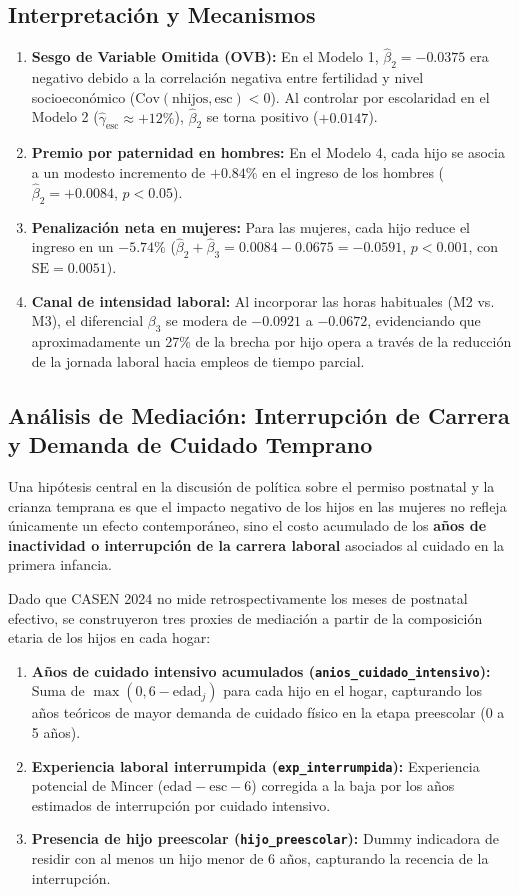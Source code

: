 \documentclass[11pt,a4paper]{article}
\begin{document}
\subsection{Interpretación y Mecanismos}
\begin{enumerate}
    \item \textbf{Sesgo de Variable Omitida (OVB):} En el Modelo 1, $\hat{\beta}_2 = -0.0375$ era negativo debido a la correlación negativa entre fertilidad y nivel socioeconómico ($\text{Cov}(\text{nhijos}, \text{esc}) < 0$). Al controlar por escolaridad en el Modelo 2 ($\hat{\gamma}_{\text{esc}} \approx +12\%$), $\hat{\beta}_2$ se torna positivo ($+0.0147$).
    \item \textbf{Premio por paternidad en hombres:} En el Modelo 4, cada hijo se asocia a un modesto incremento de $+0.84\%$ en el ingreso de los hombres ($\hat{\beta}_2 = +0.0084$, $p < 0.05$).
    \item \textbf{Penalización neta en mujeres:} Para las mujeres, cada hijo reduce el ingreso en un \textbf{$-5.74\%$} ($\hat{\beta}_2 + \hat{\beta}_3 = 0.0084 - 0.0675 = -0.0591$, $p < 0.001$, con $\text{SE} = 0.0051$).
    \item \textbf{Canal de intensidad laboral:} Al incorporar las horas habituales (M2 vs. M3), el diferencial $\beta_3$ se modera de $-0.0921$ a $-0.0672$, evidenciando que aproximadamente un 27\% de la brecha por hijo opera a través de la reducción de la jornada laboral hacia empleos de tiempo parcial.
\end{enumerate}

\subsection{Análisis de Mediación: Interrupción de Carrera y Demanda de Cuidado Temprano}
Una hipótesis central en la discusión de política sobre el permiso postnatal y la crianza temprana es que el impacto negativo de los hijos en las mujeres no refleja únicamente un efecto contemporáneo, sino el costo acumulado de los \textbf{años de inactividad o interrupción de la carrera laboral} asociados al cuidado en la primera infancia.

Dado que CASEN 2024 no mide retrospectivamente los meses de postnatal efectivo, se construyeron tres proxies de mediación a partir de la composición etaria de los hijos en cada hogar:
\begin{enumerate}
    \item \textbf{Años de cuidado intensivo acumulados (\texttt{anios\_cuidado\_intensivo}):} Suma de $\max(0, 6 - \text{edad}_j)$ para cada hijo en el hogar, capturando los años teóricos de mayor demanda de cuidado físico en la etapa preescolar (0 a 5 años).
    \item \textbf{Experiencia laboral interrumpida (\texttt{exp\_interrumpida}):} Experiencia potencial de Mincer ($\text{edad} - \text{esc} - 6$) corregida a la baja por los años estimados de interrupción por cuidado intensivo.
    \item \textbf{Presencia de hijo preescolar (\texttt{hijo\_preescolar}):} Dummy indicadora de residir con al menos un hijo menor de 6 años, capturando la recencia de la interrupción.
\end{enumerate}
\end{document}
